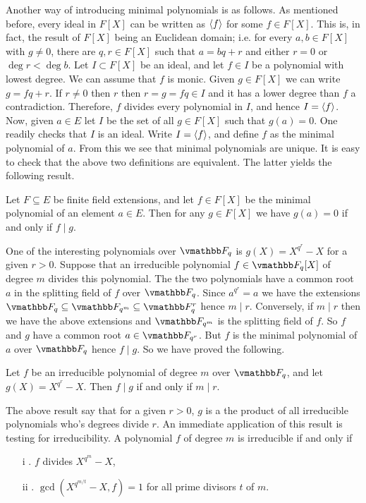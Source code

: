 Another way of introducing minimal polynomials is as follows. As mentioned before, 
every ideal in $F[X]$ can be written as $\langle f\rangle$ for some $f \in F[X]$. This is, in fact, the 
result of $F[X]$ being an Euclidean domain; i.e. for every $a, b \in F[X]$ with $g \ne 0$, there 
are $q, r \in F[X]$ such that $a = bq + r$ and either $r = 0$ or $\deg r < \deg b$. Let $I \subset 
F[X]$ be an ideal, and let $f \in I$ be a polynomial with lowest degree. We can assume that $f$ is 
monic. Given $g \in F[X]$ we can write $g = fq + r$. If $r \ne 0$ then $r$ then $r = g = fq \in I$ 
and it has a lower degree than $f$ a contradiction. Therefore, $f$ divides every polynomial in 
$I$, and hence $I = \langle f\rangle$. Now, given $a \in E$ let $I$ be the set of all $g \in F[X]$ such 
that $g(a) = 0$. One readily checks that $I$ is an ideal. Write $I = \langle f\rangle$, and define $f$ as 
the minimal polynomial of $a$. From this we see that minimal polynomials are unique. It is easy to 
check that the above two definitions are equivalent. The latter yields the following result.
\begin{result}
	Let $F \subseteq E$ be finite field extensions, and let $f \in F[X]$ be the minimal polynomial 
	of an element $a \in E$. Then for any $g \in F[X]$ we have $g(a) = 0$ if and only if $f \mid g$.
\end{result}
One of the interesting polynomials over $\F_q$ is $g(X) = X^{q^r} - X$ for a given $r > 0$. Suppose 
that an irreducible polynomial $f \in \F_q[X]$ of degree $m$ divides this polynomial. The the two 
polynomials have a common root $a$ in the splitting field of $f$ over $\F_q$. Since $a^{q^r} = a$ 
we have the extensions $\F_q \subseteq \F_{q^m} \subseteq \F_q^r$ hence $m \mid r$. Conversely, if 
$m \mid r$ then we have the above extensions and $\F_{q^m}$ is the splitting field of $f$. So $f$ 
and $g$ have a common root $a \in \F_{q^r}$. But $f$ is the minimal polynomial of $a$ over $\F_q$ 
hence $f \mid g$. So we have proved the following. 
\begin{result}
	Let $f$ be an irreducible polynomial of degree $m$ over $\F_q$, and let $g(X) = X^{q^r} - X$. 
	Then $f \mid g$ if and only if $m \mid r$.
\end{result}
The above result say that for a given $r > 0$, $g$ is a the product of all irreducible polynomials 
who's degrees divide $r$. An immediate application of this result is testing for irreducibility. A 
polynomial $f$ of degree $m$ is irreducible if and only if
\begin{enumerate}
	\setlength\itemsep{0mm}
	\item[i]. $f$ divides $X^{q^m} - X$,
	\item[ii]. $\gcd(X^{q^{m / t}} - X, f) = 1$ for all prime divisors $t$ of $m$.
\end{enumerate}
